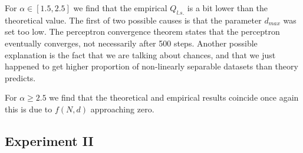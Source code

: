 For $\alpha \in [1.5, 2.5]$ we find that the empirical $Q_{l.s.}$ is a bit lower than the theoretical value. The first of two possible causes is that the parameter $d_{max}$ was set too low. The perceptron convergence theorem states that the perceptron eventually converges, not necessarily after 500 steps. Another possible explanation is the fact that we are talking about chances, and that we just happened to get higher proportion of non-linearly separable datasets than theory predicts. 

For $\alpha \geq 2.5$ we find that the theoretical and empirical results coincide once again this is due to $f(N,d)$ approaching zero.

\subsection*{Experiment II}

